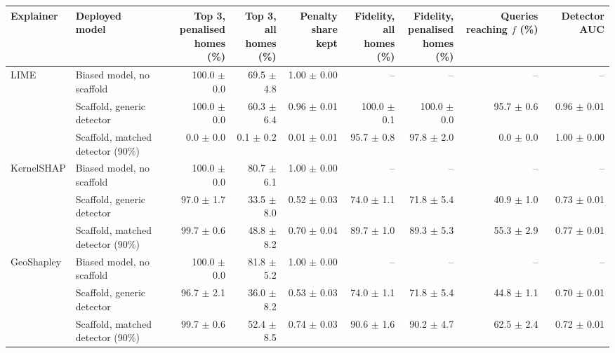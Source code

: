 \begin{table}[t]
\centering
\footnotesize
\setlength{\tabcolsep}{3.5pt}
\begin{adjustbox}{max width=\linewidth}
\begin{tabular}{llrrrrrrr}
\toprule
Explainer & \makecell[b]{Deployed \\ model} & \makecell[b]{Top 3, \\ penalised \\ homes (\%)} & \makecell[b]{Top 3, all \\ homes (\%)} & \makecell[b]{Penalty share \\ kept} & \makecell[b]{Fidelity, all \\ homes (\%)} & \makecell[b]{Fidelity, \\ penalised \\ homes (\%)} & \makecell[b]{Queries \\ reaching $f$ \\ (\%)} & Detector AUC \\
\midrule
LIME & Biased model, no scaffold & 100.0 $\pm$ 0.0 & 69.5 $\pm$ 4.8 & 1.00 $\pm$ 0.00 & -- & -- & -- & -- \\
 & Scaffold, generic detector & 100.0 $\pm$ 0.0 & 60.3 $\pm$ 6.4 & 0.96 $\pm$ 0.01 & 100.0 $\pm$ 0.1 & 100.0 $\pm$ 0.0 & 95.7 $\pm$ 0.6 & 0.96 $\pm$ 0.01 \\
 & Scaffold, matched detector (90\%) & 0.0 $\pm$ 0.0 & 0.1 $\pm$ 0.2 & 0.01 $\pm$ 0.01 & 95.7 $\pm$ 0.8 & 97.8 $\pm$ 2.0 & 0.0 $\pm$ 0.0 & 1.00 $\pm$ 0.00 \\
\midrule
KernelSHAP & Biased model, no scaffold & 100.0 $\pm$ 0.0 & 80.7 $\pm$ 6.1 & 1.00 $\pm$ 0.00 & -- & -- & -- & -- \\
 & Scaffold, generic detector & 97.0 $\pm$ 1.7 & 33.5 $\pm$ 8.0 & 0.52 $\pm$ 0.03 & 74.0 $\pm$ 1.1 & 71.8 $\pm$ 5.4 & 40.9 $\pm$ 1.0 & 0.73 $\pm$ 0.01 \\
 & Scaffold, matched detector (90\%) & 99.7 $\pm$ 0.6 & 48.8 $\pm$ 8.2 & 0.70 $\pm$ 0.04 & 89.7 $\pm$ 1.0 & 89.3 $\pm$ 5.3 & 55.3 $\pm$ 2.9 & 0.77 $\pm$ 0.01 \\
\midrule
GeoShapley & Biased model, no scaffold & 100.0 $\pm$ 0.0 & 81.8 $\pm$ 5.2 & 1.00 $\pm$ 0.00 & -- & -- & -- & -- \\
 & Scaffold, generic detector & 96.7 $\pm$ 2.1 & 36.0 $\pm$ 8.2 & 0.53 $\pm$ 0.03 & 74.0 $\pm$ 1.1 & 71.8 $\pm$ 5.4 & 44.8 $\pm$ 1.1 & 0.70 $\pm$ 0.01 \\
 & Scaffold, matched detector (90\%) & 99.7 $\pm$ 0.6 & 52.4 $\pm$ 8.5 & 0.74 $\pm$ 0.03 & 90.6 $\pm$ 1.6 & 90.2 $\pm$ 4.7 & 62.5 $\pm$ 2.4 & 0.72 $\pm$ 0.01 \\

\end{tabular}
\end{adjustbox}
\end{table}
